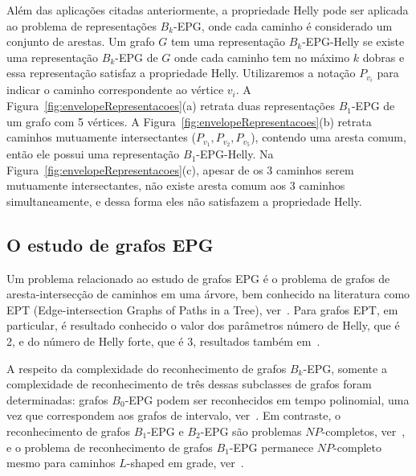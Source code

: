 Além das aplicações citadas anteriormente, a propriedade Helly pode ser aplicada ao problema de representações $ B_k$-EPG, onde cada caminho é considerado um conjunto de arestas. Um grafo $ G $ tem uma representação $ B_k$-EPG-Helly se existe uma representação $ B_k $-EPG de $G$ onde cada caminho tem no máximo $ k $ dobras e essa representação satisfaz a propriedade Helly. 
Utilizaremos a notação $P_{v_i}$ para indicar o caminho correspondente ao vértice $v_i$.
A Figura~\ref{fig:envelopeRepresentacoes}(a) retrata duas representações  $B_1$-EPG  de um grafo com 5 vértices. A Figura~\ref{fig:envelopeRepresentacoes}(b)   retrata caminhos mutuamente intersectantes ($P_{v_1}, P_{v_2}, P_{v_5}$), contendo uma aresta comum, então ele possui uma representação $ B_1$-EPG-Helly. Na Figura~\ref{fig:envelopeRepresentacoes}(c), apesar de os 3 caminhos serem mutuamente intersectantes, não existe aresta comum aos 3 caminhos simultaneamente, e dessa forma eles não satisfazem a propriedade Helly.





\subsection{O estudo de grafos EPG}

Um problema relacionado ao estudo de grafos EPG 
 é o problema de grafos de aresta-intersecção de caminhos em uma árvore, bem conhecido na literatura como EPT (Edge-intersection Graphs of Paths
in a Tree), ver~\cite{golumbic2004recognition}. Para grafos EPT, em particular, é resultado conhecido o valor dos parâmetros número de Helly, que  é 2, e do número de Helly forte, que é 3, resultados também em~\cite{golumbic2004recognition}. %

A respeito da complexidade do reconhecimento de grafos $B_k$-EPG, somente a complexidade de reconhecimento de três dessas subclasses de grafos foram determinadas: grafos
 $B_0$-EPG podem ser reconhecidos em tempo polinomial, uma vez que correspondem aos grafos de intervalo, ver~\cite{booth1976}. Em contraste, o reconhecimento de grafos $B_1$-EPG e $B_2$-EPG são problemas  $NP$-completos, ver~\cite{heldt2014, martin2017}, e o problema de reconhecimento de grafos $B_1$-EPG permanece $NP$-completo mesmo para caminhos $L$-shaped em grade, ver~\cite{cameron2016edge}.

